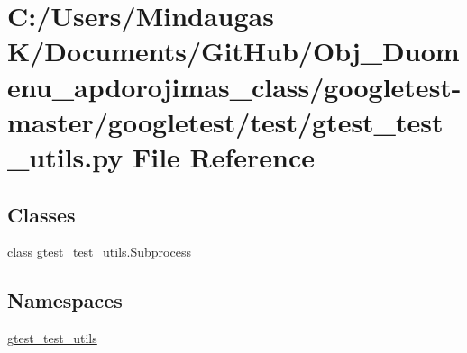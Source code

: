 \hypertarget{googletest-master_2googletest_2test_2gtest__test__utils_8py}{}\section{C\+:/\+Users/\+Mindaugas K/\+Documents/\+Git\+Hub/\+Obj\+\_\+\+Duomenu\+\_\+apdorojimas\+\_\+class/googletest-\/master/googletest/test/gtest\+\_\+test\+\_\+utils.py File Reference}
\label{googletest-master_2googletest_2test_2gtest__test__utils_8py}
\subsection*{Classes}
\begin{DoxyCompactItemize}
\item 
class \mbox{\hyperlink{classgtest__test__utils_1_1_subprocess}{gtest\+\_\+test\+\_\+utils.\+Subprocess}}
\end{DoxyCompactItemize}
\subsection*{Namespaces}
\begin{DoxyCompactItemize}
\item 
 \mbox{\hyperlink{namespacegtest__test__utils}{gtest\+\_\+test\+\_\+utils}}
\end{DoxyCompactItemize}
